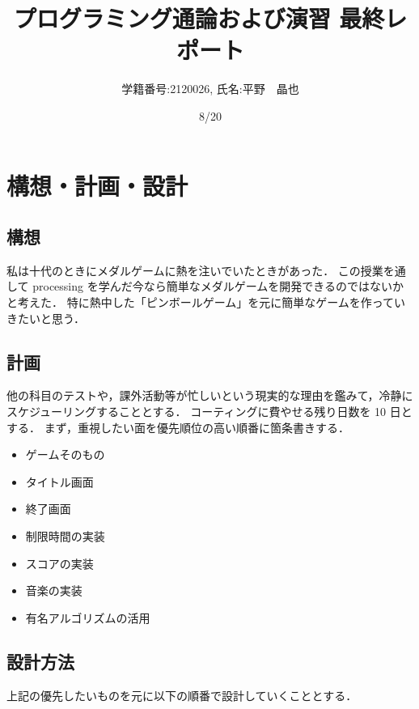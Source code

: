\documentclass[12pt,a4j]{jarticle}
\begin{document}
\title{プログラミング通論および演習 最終レポート}
\author{学籍番号:2120026, 氏名:平野　晶也}
\date{8/20}
\maketitle

\section{構想・計画・設計}
\subsection{構想}
私は十代のときにメダルゲームに熱を注いでいたときがあった．
この授業を通して processing を学んだ今なら簡単なメダルゲームを開発できるのではないかと考えた．
特に熱中した「ピンボールゲーム」を元に簡単なゲームを作っていきたいと思う．

\subsection{計画}
他の科目のテストや，課外活動等が忙しいという現実的な理由を鑑みて，冷静にスケジューリングすることとする．
コーティングに費やせる残り日数を 10 日とする．
まず，重視したい面を優先順位の高い順番に箇条書きする．

\begin{itemize}
  \item ゲームそのもの
  \item タイトル画面
  \item 終了画面
  \item 制限時間の実装
  \item スコアの実装
  \item 音楽の実装
  \item 有名アルゴリズムの活用
\end{itemize}

\subsection{設計方法}
上記の優先したいものを元に以下の順番で設計していくこととする．
\end{document}

